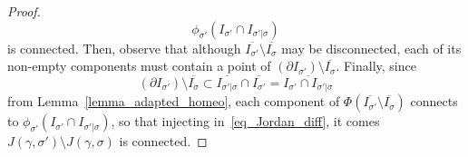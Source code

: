 \documentclass[10pt,a4paper]{amsart}
\begin{document}
\begin{proof}
        \[\phi_{\sigma'}(I_{\sigma'}\cap I_{\sigma'|\sigma})\]
    is connected. Then, observe that although $\overline{{I_{\sigma'}}}\setminus\overline{I_\sigma}$ may be disconnected, each of its non-empty components must contain a point of $(\partial I_{\sigma'})\setminus\overline{I_\sigma}$. Finally, since
        \[(\partial I_{\sigma'})\setminus\overline{I_\sigma}\subset\overline{I_{\sigma'|\sigma}}\cap \overline{I_{\sigma'}}=\overline{I_{\sigma'}\cap I_{\sigma'|\sigma}}\]
    from Lemma~\ref{lemma_adapted_homeo}, each component of $\Phi(\overline{{I_{\sigma'}}}\setminus\overline{I_\sigma})$ connects to $\phi_{\sigma'}(I_{\sigma'}\cap I_{\sigma'|\sigma})$, so that injecting in~\eqref{eq_Jordan_diff}, it comes $J(\gamma,\sigma')\setminus J(\gamma,\sigma)$ is connected.
\end{proof}
\end{document}

